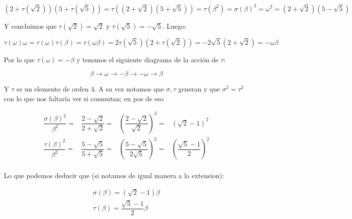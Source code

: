 \documentclass[11pt]{article}
\numberwithin{theorem}{subsection}
\begin{document}
\begin{enumerate}
\begin{itemize}
		\begin{equation*}
		\left(2 + \tau(\sqrt{2})\right)\left(5 + \tau(\sqrt{5})\right) = \tau\left(\left(2 + \sqrt{2}\right)\left(5 + \sqrt{5}\right)\right) = \tau(\beta^2) = \sigma(\beta)^2 = \omega^2 = \left(2 + \sqrt{2}\right) \left(5 -\sqrt{5}\right)
		\end{equation*}
		
		Y concluimos que $\tau(\sqrt{2}) = \sqrt{2}$ y $\tau(\sqrt{5}) = -\sqrt{5}$. Luego:
		
		\begin{equation*}
		\tau(\omega)\omega = \tau(\omega)\tau(\beta) = \tau(\omega\beta) = 2\tau(\sqrt{5})(2 + \tau(\sqrt{2})) = - 2\sqrt{5}(2 + \sqrt{2}) = - \omega\beta
		\end{equation*}
		
		Por lo que $\tau(\omega)= -\beta$	y tenemos el siguiente diagrama de la acci\'on de $\tau$:
		
		\begin{equation*}
		\beta \rightarrow \omega \rightarrow - \beta \rightarrow - \omega \rightarrow \beta
		\end{equation*}
		
		Y $\tau$ es un elemento de orden 4. A su vez notamos que $\sigma, \tau$ generan y que $\sigma^2 = \tau^2$ con lo que nos faltar\'ia ver si conmutan; en pos de eso
		
		\begin{equation*}
			\begin{aligned}
				\dfrac{\sigma(\beta)^2}{\beta^2} = & \dfrac{2 - \sqrt{2}}{2 + \sqrt{2}} = & \left(\dfrac{2 - \sqrt{2}}{\sqrt{2}}\right)^2 = & \left(\sqrt{2} - 1\right)^2 \\
				\dfrac{\tau(\beta)^2}{\beta^2} = & \dfrac{5 - \sqrt{5}}{5 + \sqrt{5}} = & \left(\dfrac{5 - \sqrt{5}}{2\sqrt{5}}\right)^2 = & \left(\dfrac{\sqrt{5} - 1}{2}\right)^2 \\				
			\end{aligned}
		\end{equation*}
		
		Lo que podemos deducir que (si notamos de igual manera a la extension):
		
		\begin{equation*}
			\begin{aligned}
				\sigma(\beta) = \left(\sqrt{2} - 1\right)\beta \\
				\tau(\beta) = \dfrac{\sqrt{5} - 1}{2} \beta
			\end{aligned}
		\end{equation*}
		

\end{itemize}
\end{enumerate}
\end{document}
